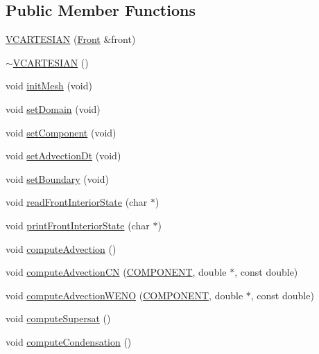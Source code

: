 \subsection*{Public Member Functions}
\begin{DoxyCompactItemize}
\item 
\hyperlink{class_v_c_a_r_t_e_s_i_a_n_a2b18336a11e435931be4607d095f8c46}{V\+C\+A\+R\+T\+E\+S\+I\+AN} (\hyperlink{fdecs_8h_ac32202b798f848095c489cfd04c4ca5f}{Front} \&front)
\item 
\hyperlink{class_v_c_a_r_t_e_s_i_a_n_a9f4916e0261c28b6e3a5c1e7fb90adce}{$\sim$\+V\+C\+A\+R\+T\+E\+S\+I\+AN} ()
\item 
void \hyperlink{class_v_c_a_r_t_e_s_i_a_n_a3ec698473db1eff5398d18ee512afcf9}{init\+Mesh} (void)
\item 
void \hyperlink{class_v_c_a_r_t_e_s_i_a_n_a991891ffbe0bc38b635a5568abe0d882}{set\+Domain} (void)
\item 
void \hyperlink{class_v_c_a_r_t_e_s_i_a_n_a9df16d1f10b88696b2486eed5a7e6164}{set\+Component} (void)
\item 
void \hyperlink{class_v_c_a_r_t_e_s_i_a_n_a22c295f9974fc526451375869435f98b}{set\+Advection\+Dt} (void)
\item 
void \hyperlink{class_v_c_a_r_t_e_s_i_a_n_a2873c171905f4abb2eefc261415d2111}{set\+Boundary} (void)
\item 
void \hyperlink{class_v_c_a_r_t_e_s_i_a_n_a79bdd55413d10659416fa7b3e2edc45a}{read\+Front\+Interior\+State} (char $\ast$)
\item 
void \hyperlink{class_v_c_a_r_t_e_s_i_a_n_aa2130c1711e5f5a0acd47847b0a1dc45}{print\+Front\+Interior\+State} (char $\ast$)
\item 
void \hyperlink{class_v_c_a_r_t_e_s_i_a_n_a10d6436a9159788eee661c8a45a56fd8}{compute\+Advection} ()
\item 
void \hyperlink{class_v_c_a_r_t_e_s_i_a_n_a8d4ed434db6c696856a3f4e904403658}{compute\+Advection\+CN} (\hyperlink{int_8h_a2bb7be12ca59ea6443c8757df0a7c278}{C\+O\+M\+P\+O\+N\+E\+NT}, double $\ast$, const double)
\item 
void \hyperlink{class_v_c_a_r_t_e_s_i_a_n_a183cdc256753533ae5cfe01f8e5cfe35}{compute\+Advection\+W\+E\+NO} (\hyperlink{int_8h_a2bb7be12ca59ea6443c8757df0a7c278}{C\+O\+M\+P\+O\+N\+E\+NT}, double $\ast$, const double)
\item 
void \hyperlink{class_v_c_a_r_t_e_s_i_a_n_a7eebe369abcba9473d5affed6d8fedde}{compute\+Supersat} ()
\item 
void \hyperlink{class_v_c_a_r_t_e_s_i_a_n_a7fc485127a59ee0b598faaa2cc92ce58}{compute\+Condensation} ()

\end{DoxyCompactItemize}
